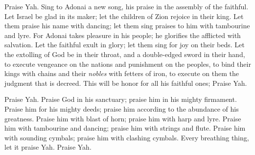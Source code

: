 \begin{biblechapter} %
 Praise Yah. 
Sing to Adonai a new song, 
his praise in the assembly of the faithful.
\verse Let Israel be glad in its maker; 
let the children of Zion rejoice in their king.
\verse Let them praise his name with dancing; 
let them sing praises to him with tambourine and lyre.
\verse For Adonai takes pleasure in his people; 
he glorifies the afflicted with salvation.
\verse Let the faithful exult in glory; 
let them sing for joy on their beds.
\verse Let the extolling of God be in their throat, 
and a double-edged sword in their hand,
\verse to execute vengeance on the nations 
and punishment on the peoples,
\verse to bind their kings with chains 
and their \textit{nobles} with fetters of iron,
\verse to execute on them the judgment that is decreed. 
This will be honor for all his faithful ones; 
Praise Yah.
\end{biblechapter}

\begin{biblechapter} %
 Praise Yah. 
Praise God in his sanctuary; 
praise him in his mighty firmament.
\verse Praise him for his mighty deeds; 
praise him according to the abundance of his greatness.
\verse Praise him with blast of horn; 
praise him with harp and lyre.
\verse Praise him with tambourine and dancing; 
praise him with strings and flute.
\verse Praise him with sounding cymbals; 
praise him with clashing cymbals.
\verse Every breathing thing, 
let it praise Yah. 
Praise Yah.
\end{biblechapter}

